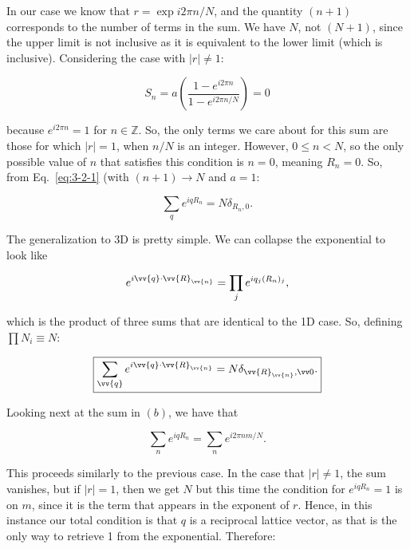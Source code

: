 \begin{parts}
  In our case we know that $r = \exp{i2\pi n/N}$, and the quantity $(n+1)$ corresponds to the number of terms in the sum. We have $N$, not $(N+1)$, since the upper limit is not inclusive as it is equivalent to the lower limit (which is inclusive). Considering the case with $|r| \neq 1$:

  \begin{equation}
    S_n = a\left( \frac{1 - e^{i2\pi n}}{1 - e^{i2\pi n/N}} \right) = 0
  \end{equation}

  because $e^{i2\pi n} = 1$ for $n \in \mathbb{Z}$. So, the only terms we care about for this sum are those for which $|r| = 1$, when $n/N$ is an integer. However, $0 \leq n < N$, so the only possible value of $n$ that satisfies this condition is $n=0$, meaning $R_n = 0$. So, from Eq.~\eqref{eq:3-2-1} (with $(n+1) \rightarrow N$ and $a = 1$:

  \begin{equation}
    \sum_q e^{iqR_n} = N\delta_{R_n,0}.
  \end{equation}

  The generalization to 3D is pretty simple. We can collapse the exponential to look like

  \begin{equation}
    e^{i\vv{q}\cdot\vv{R}_{\vv{n}}} = \prod_j e^{iq_j(R_n)_j},
  \end{equation}

  which is the product of three sums that are identical to the 1D case. So, defining $\prod N_i \equiv N$:

  \begin{equation}
    \boxed{\sum_{\vv{q}}e^{i\vv{q}\cdot\vv{R}_{\vv{n}}} = N\delta_{\vv{R}_{\vv{n}},\vv 0}.}
  \end{equation}

  Looking next at the sum in $(b)$, we have that

  \begin{equation}
    \sum_n e^{iqR_n} = \sum_n e^{i2\pi nm/N}.
  \end{equation}

  This proceeds similarly to the previous case. In the case that $|r| \neq 1$, the sum vanishes, but if $|r|=1$, then we get $N$ but this time the condition for $e^{iqR_n}=1$ is on $m$, since it is the term that appears in the exponent of $r$. Hence, in this instance our total condition is that $q$ is a reciprocal lattice vector, as that is the only way to retrieve 1 from the exponential. Therefore:


\end{parts}
